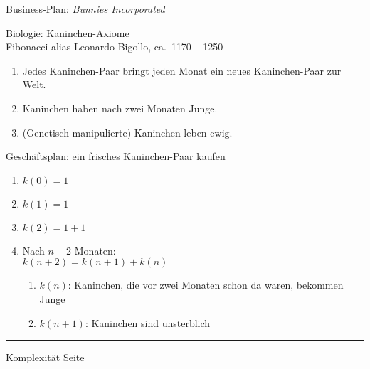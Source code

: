 \documentclass{slides}
\newcounter{mypage}
\begin{document}
\begin{slide}{}
 \begin{center}
Business-Plan: \quad \textsl{Bunnies Incorporated}
\end{center}

\footnotesize
Biologie: Kaninchen-Axiome \\
Fibonacci alias Leonardo Bigollo, ca.~1170 -- 1250
\begin{enumerate}
\item Jedes Kaninchen-Paar bringt jeden Monat ein neues Kaninchen-Paar zur Welt.
\item Kaninchen haben nach zwei Monaten Junge.
\item (Genetisch manipulierte) Kaninchen leben ewig.
\end{enumerate}

Gesch\"aftsplan: ein frisches Kaninchen-Paar kaufen
\begin{enumerate}
\item $k(0) = 1$
\item $k(1) = 1$
\item $k(2) = 1 + 1$
\item Nach $n + 2$ Monaten: \\[0.3cm]
      \hspace*{1.3cm} 
      $k(n+2) = k(n+1) + k(n)$
      \begin{enumerate}
      \item $k(n)$: Kaninchen, die vor zwei Monaten schon da waren, bekommen Junge
      \item $k(n+1)$: Kaninchen sind unsterblich
      \end{enumerate}
\end{enumerate}

\vspace*{\fill}
\tiny \addtocounter{mypage}{1}
\rule{17cm}{1mm}
Komplexit\"at  \hspace*{\fill} Seite 
\end{slide}
\end{document}
